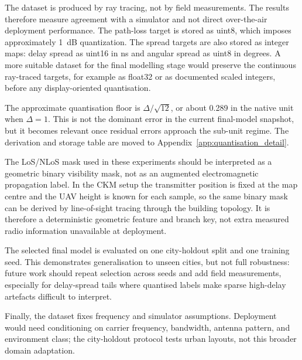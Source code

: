 The dataset is produced by ray tracing, not by field measurements. The results
therefore measure agreement with a simulator and not direct over-the-air
deployment performance. The path-loss target is stored as uint8, which imposes
approximately \SI{1}{dB} quantization. The spread targets are also stored as
integer maps: delay spread as uint16 in ns and angular spread as uint8 in
degrees. A more suitable dataset for the final modelling stage would preserve
the continuous ray-traced targets, for example as float32 or as documented
scaled integers, before any display-oriented quantisation.

The approximate quantisation floor is \(\Delta/\sqrt{12}\), or about
\SI{0.289}{} in the native unit when \(\Delta=1\). This is not the dominant
error in the current final-model snapshot, but it becomes relevant once residual
errors approach the sub-unit regime. The derivation and storage table are moved
to Appendix~\ref{app:quantisation_detail}.

The LoS/NLoS mask used in these experiments should be interpreted as a
geometric binary visibility mask, not as an augmented electromagnetic
propagation label. In the CKM setup the transmitter position is fixed at the
map centre and the UAV height is known for each sample, so the same binary mask
can be derived by line-of-sight tracing through the building topology. It is
therefore a deterministic geometric feature and branch key, not extra measured
radio information unavailable at deployment.

The selected final model is evaluated on one city-holdout split and one
training seed. This demonstrates generalisation to unseen cities, but not full
robustness: future work should repeat selection across seeds and add field
measurements, especially for delay-spread tails where quantised labels make
sparse high-delay artefacts difficult to interpret.

Finally, the dataset fixes frequency and simulator assumptions. Deployment
would need conditioning on carrier frequency, bandwidth, antenna pattern, and
environment class; the city-holdout protocol tests urban layouts, not this
broader domain adaptation.
